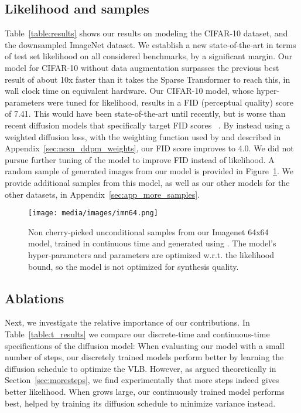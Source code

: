 \documentclass{article}
\begin{document}
\subsection{Likelihood and samples}
Table~\ref{table:results} shows our results on modeling the CIFAR-10 dataset, and the downsampled ImageNet dataset. We establish a new state-of-the-art in terms of test set likelihood on all considered benchmarks, by a significant margin. Our model for CIFAR-10 without data augmentation surpasses the previous best result of  about 10x faster than it takes the Sparse Transformer to reach this, in wall clock time on equivalent hardware.
Our CIFAR-10 model, whose hyper-parameters were tuned for likelihood, results in a FID (perceptual quality) score of 7.41. This would have been state-of-the-art until recently, but is worse than recent diffusion models that specifically target FID scores ~\citep{nichol2021improved,song2020score,ho2020denoising}. By instead using a weighted diffusion loss, with the weighting function  used by \cite{ho2020denoising} and described in Appendix~\ref{sec:ncsn_ddpm_weights}, our FID score improves to 4.0. We did not pursue further tuning of the model to improve FID instead of likelihood.
A random sample of generated images from our model is provided in Figure~\ref{fig:imagenet64}. We provide additional samples from this model, as well as our other models for the other datasets, in Appendix~\ref{sec:app_more_samples}.
\begin{figure}[t]
    \centering
    \texttt{[image: media/images/imn64.png]}
    \caption{Non cherry-picked unconditional samples from our Imagenet 64x64 model, trained in continuous time and generated using . The model's hyper-parameters and parameters are optimized w.r.t. the likelihood bound, so the model is not optimized for synthesis quality.}
    \label{fig:imagenet64}
\end{figure}

\subsection{Ablations}
Next, we investigate the relative importance of our contributions. In Table~\ref{table:t_results} we compare our discrete-time and continuous-time specifications of the diffusion model: When evaluating our model with a small number of steps, our discretely trained models perform better by learning the diffusion schedule to optimize the VLB. However, as argued theoretically in Section~\ref{sec:moresteps}, we find experimentally that more steps  indeed gives better likelihood. When  grows large, our continuously trained model performs best, helped by training its diffusion schedule to minimize variance instead. 
\end{document}
